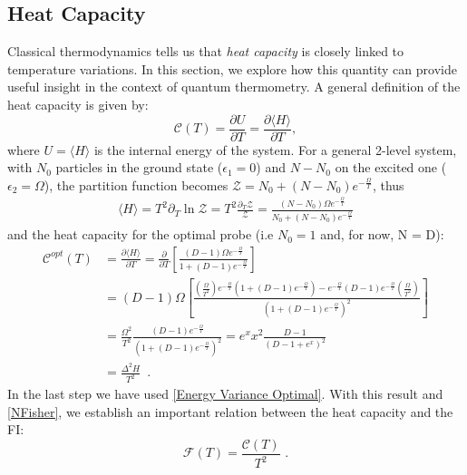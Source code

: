 \subsection{Heat Capacity}
Classical thermodynamics tells us that \textit{heat capacity} is closely linked to temperature variations. In this section, we explore how this quantity can provide useful insight in the context of quantum thermometry. A general definition of the heat capacity is given by:
\begin{equation}
    \mathcal{C}(T) = \frac{\partial U}{\partial T} = \frac{\partial \langle H \rangle}{\partial T},
\end{equation}
where \( U = \langle H \rangle \) is the internal energy of the system. For a general 2-level system, with $N_0$ particles in the ground state ($\epsilon_1=0$) and $N-N_0$ on the excited one ($\epsilon_2=\Omega$), the partition function becomes $\mathcal{Z}=N_0+(N-N_0)e^{-\frac{\Omega}{T}}$, thus
\begin{align}
   \langle H \rangle=T^2\partial_T\ln{\mathcal{Z}}=T^2\frac{\partial_T\mathcal{Z}}{\mathcal{Z}}=\frac{(N-N_0)\Omega e^{-\frac{\Omega}{T}}}{N_0+(N-N_0)e^{-\frac{\Omega}{T}}}
   \label{expectedH_general2}
\end{align}
and the heat capacity for the optimal probe (i.e $N_0 = 1$ and, for now, N = D):
\begin{align}
    \mathcal{C}^{opt}(T)&= \frac{\partial\langle H \rangle }{\partial T} = \frac{\partial}{\partial T}\left[\frac{(D-1)\Omega e^{-\frac{\Omega}{T}}}{1+(D-1)e^{-\frac{\Omega}{T}}}\right]\\
    &=(D-1)\Omega\left[\frac{\left(\frac{\Omega}{T^2}\right) e^{-\frac{\Omega}{T}}\left(1+(D-1)e^{-\frac{\Omega}{T}}\right)-e^{-\frac{\Omega}{T}}(D-1)e^{-\frac{\Omega}{T}}\left(\frac{\Omega}{T^2}\right)}{\left(1+(D-1)e^{-\frac{\Omega}{T}}\right)^2}\right]\\
    &=\frac{\Omega^2}{T^2}\frac{(D-1)e^{-\frac{\Omega}{T}}}{\left(1+(D-1)e^{-\frac{\Omega}{T}}\right)^2}=e^x x^2\frac{D-1}{\left(D-1+e^{x}\right)^2} \label{C_opt_T}\\
    &=\frac{\Delta^2 H}{T^2} \,\,\,.
    \label{C-H}
\end{align}
In the last step we have used \eqref{Energy Variance Optimal}. With this result and \eqref{NFisher}, we establish an important relation between the heat capacity and the FI:
\begin{equation}
    \mathcal{F}(T)=\frac{\mathcal{C}(T)}{T^2}\,\,.
\end{equation}
\par
